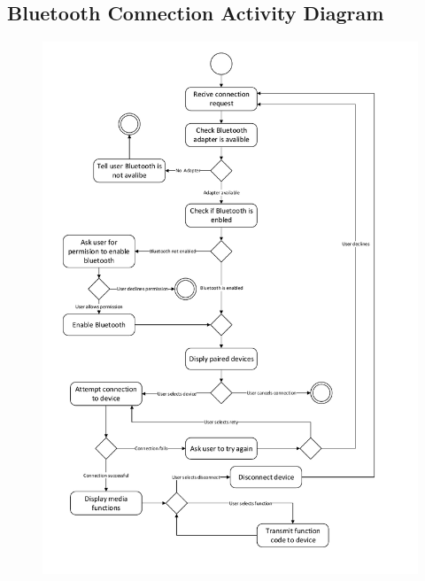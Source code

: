 \documentclass{article}
\begin{document}
\begin{appendices}
		\section{Bluetooth Connection Activity Diagram}
			\begin{figure}[H]
				\centering
				\label{AppBtActivity}
				\includegraphics*[scale = 0.75]{applicationConnectionActivity}
			\end{figure}
			

\end{appendices}
\end{document}
